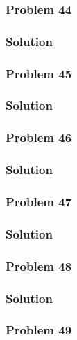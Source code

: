 \documentclass[journal,12pt,twocolumn]{IEEEtran}
\begin{document}
\subsubsection{Problem 44}

%
\subsubsection{Solution}

\subsubsection{Problem 45}

%
\subsubsection{Solution}


\subsubsection{Problem 46}

%
\subsubsection{Solution}


\subsubsection{Problem 47}

%
\subsubsection{Solution}


\subsubsection{Problem 48}

%
\subsubsection{Solution}


\subsubsection{Problem 49}

%
\end{document}
